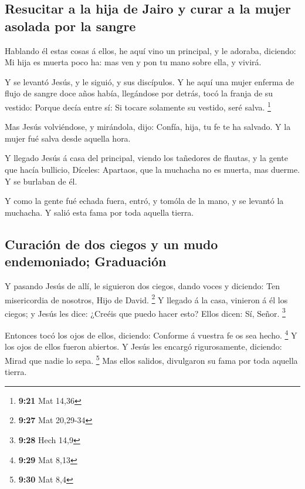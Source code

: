 \hypertarget{resucitar-a-la-hija-de-jairo-y-curar-a-la-mujer-asolada-por-la-sangre}{%
\subsection{Resucitar a la hija de Jairo y curar a la mujer asolada por
la
sangre}\label{resucitar-a-la-hija-de-jairo-y-curar-a-la-mujer-asolada-por-la-sangre}}

 Hablando él estas cosas á ellos, he aquí vino un
principal, y le adoraba, diciendo: Mi hija es muerta poco ha: mas ven y
pon tu mano sobre ella, y vivirá.

 Y se levantó Jesús, y le siguió, y sus discípulos.
 Y he aquí una mujer enferma de flujo de sangre doce años
había, llegándose por detrás, tocó la franja de su vestido:
 Porque decía entre sí: Si tocare solamente su vestido,
seré salva. \footnote{\textbf{9:21} Mat 14,36}

 Mas Jesús volviéndose, y mirándola, dijo: Confía, hija, tu
fe te ha salvado. Y la mujer fué salva desde aquella hora.

 Y llegado Jesús á casa del principal, viendo los tañedores
de flautas, y la gente que hacía bullicio,  Díceles:
Apartaos, que la muchacha no es muerta, mas duerme. Y se burlaban de él.

 Y como la gente fué echada fuera, entró, y tomóla de la
mano, y se levantó la muchacha.  Y salió esta fama por toda
aquella tierra.

\hypertarget{curaciuxf3n-de-dos-ciegos-y-un-mudo-endemoniado-graduaciuxf3n}{%
\subsection{Curación de dos ciegos y un mudo endemoniado;
Graduación}\label{curaciuxf3n-de-dos-ciegos-y-un-mudo-endemoniado-graduaciuxf3n}}

 Y pasando Jesús de allí, le siguieron dos ciegos, dando
voces y diciendo: Ten misericordia de nosotros, Hijo de David.
\footnote{\textbf{9:27} Mat 20,29-34}  Y llegado á la casa,
vinieron á él los ciegos; y Jesús les dice: ¿Creéis que puedo hacer
esto? Ellos dicen: Sí, Señor. \footnote{\textbf{9:28} Hech 14,9}

 Entonces tocó los ojos de ellos, diciendo: Conforme á
vuestra fe os sea hecho. \footnote{\textbf{9:29} Mat 8,13} 
Y los ojos de ellos fueron abiertos. Y Jesús les encargó rigurosamente,
diciendo: Mirad que nadie lo sepa. \footnote{\textbf{9:30} Mat 8,4}
 Mas ellos salidos, divulgaron su fama por toda aquella
tierra.

